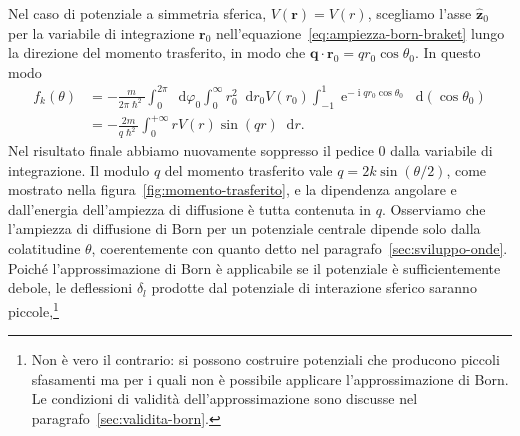 \documentclass[a4paper,fleqn,twoside,12pt]{article}
\renewcommand{\phi}{\varphi}
\newcommand*{\dd}{\mathop{}\!\mathrm{d}} %
\DeclareMathOperator{\e}{\mathrm{e}} %
\DeclareMathOperator{\uimm}{\mathrm{i}} %
\DeclarePairedDelimiter{\abs}{\lvert}{\rvert}
\newcommand*{\versor}[1]{\hat{\bm{#1}}}
\begin{document}
\begin{SCfigure}[2]
  \centering
  \caption{Il momento trasferito $\bm{q} = \bm{k}' - \bm{k}$ è la base del
    triangolo isoscele di lati lunghi $k$ e con angolo al vertice $\theta$,
    quindi $q = \abs{\bm{q}} = 2k\sin(\theta/2)$.}
\label{fig:momento-trasferito}
\end{SCfigure}
Nel caso di potenziale a simmetria sferica, $V(\bm{r}) = V(r)$, scegliamo l'asse
$\versor{z}_{0}$ per la variabile di integrazione $\bm{r}_{0}$
nell'equazione~\eqref{eq:ampiezza-born-braket} lungo la direzione del momento
trasferito, in modo che $\bm{q}\cdot\bm{r}_{0} = qr_{0}\cos\theta_{0}$.  In
questo modo
\begin{equation}
  \label{eq:ampiezza-born-centrale}
  \begin{split}
    f_{k}(\theta) &= -\frac{m}{2\pi\hslash^{2}} \int_{0}^{2\pi}\dd\phi_{0}
    \int_{0}^{\infty}r_{0}^{2}\dd r_{0} V(r_{0}) \int_{-1}^{1}\e^{-\uimm q
      r_{0}\cos\theta_{0}} \dd(\cos\theta_{0}) \\
    &= -\frac{2m}{q\hslash^{2}}\int_{0}^{+\infty} rV(r)\sin(qr)\dd r.
  \end{split}
\end{equation}
Nel risultato finale abbiamo nuovamente soppresso il pedice $0$ dalla variabile
di integrazione.  Il modulo $q$ del momento trasferito vale
$q = 2k\sin(\theta/2)$, come mostrato nella figura~\ref{fig:momento-trasferito},
e la dipendenza angolare e dall'energia dell'ampiezza di diffusione è tutta
contenuta in $q$.  Osserviamo che l'ampiezza di diffusione di Born per un
potenziale centrale dipende solo dalla colatitudine $\theta$, coerentemente con
quanto detto nel paragrafo~\ref{sec:sviluppo-onde}.  Poiché l'approssimazione di
Born è applicabile se il potenziale è sufficientemente debole, le deflessioni
$\delta_{l}$ prodotte dal potenziale di interazione sferico saranno
piccole,\footnote{Non è vero il contrario: si possono costruire potenziali che
  producono piccoli sfasamenti ma per i quali non è possibile applicare
  l'approssimazione di Born.  Le condizioni di validità dell'approssimazione
  sono discusse nel paragrafo~\ref{sec:validita-born}.}
\end{document}
